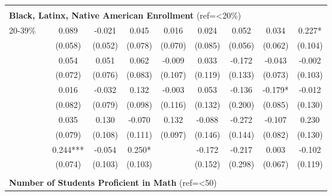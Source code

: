 \begin{tabular*}{\linewidth}{@{\extracolsep{\fill} } llcccccccc}
\hline%
&&&&&&&&&\\%
\multicolumn{10}{l}{\multirow{2}{1.8in}{\textbf{Black, Latinx, Native American Enrollment} (ref=<20\%)}}\\%
&&&&&&&&&\\%
\multirow{2}{*}{\hspace{0.2cm}20{-}39\%}&&0.089&{-}0.021&0.045&0.016&0.024&0.052&0.034&0.227*\\%
&&(0.058)&(0.052)&(0.078)&(0.070)&(0.085)&(0.056)&(0.062)&(0.104)\\%
\arrayrulecolor{white}%
\hline%
\arrayrulecolor{white}%
\hline%
\arrayrulecolor{white}%
\hline%
\arrayrulecolor{white}%
\hline%
\arrayrulecolor{white}%
\hline%
\multirow{2}{*}{\hspace{0.2cm}40{-}59\%}&&0.054&0.051&0.062&{-}0.009&0.033&{-}0.172&{-}0.043&{-}0.002\\%
&&(0.072)&(0.076)&(0.083)&(0.107)&(0.119)&(0.133)&(0.073)&(0.103)\\%
\arrayrulecolor{white}%
\hline%
\arrayrulecolor{white}%
\hline%
\arrayrulecolor{white}%
\hline%
\arrayrulecolor{white}%
\hline%
\arrayrulecolor{white}%
\hline%
\multirow{2}{*}{\hspace{0.2cm}60{-}79\%}&&0.016&{-}0.032&0.132&{-}0.003&0.053&{-}0.136&{-}0.179*&{-}0.012\\%
&&(0.082)&(0.079)&(0.098)&(0.116)&(0.132)&(0.200)&(0.085)&(0.130)\\%
\arrayrulecolor{white}%
\hline%
\arrayrulecolor{white}%
\hline%
\arrayrulecolor{white}%
\hline%
\arrayrulecolor{white}%
\hline%
\arrayrulecolor{white}%
\hline%
\multirow{2}{*}{\hspace{0.2cm}80{-}89\%}&&0.035&0.130&{-}0.070&0.132&{-}0.088&{-}0.272&{-}0.107&0.230\\%
&&(0.079)&(0.108)&(0.111)&(0.097)&(0.146)&(0.144)&(0.082)&(0.130)\\%
\arrayrulecolor{white}%
\hline%
\arrayrulecolor{white}%
\hline%
\arrayrulecolor{white}%
\hline%
\arrayrulecolor{white}%
\hline%
\arrayrulecolor{white}%
\hline%
\multirow{2}{*}{\hspace{0.2cm}90\%+}&&0.244***&{-}0.054&0.250*&&{-}0.172&{-}0.217&0.003&{-}0.102\\%
&&(0.074)&(0.103)&(0.103)&&(0.152)&(0.298)&(0.067)&(0.119)\\%
\arrayrulecolor{white}%
\hline%
\arrayrulecolor{white}%
\hline%
\arrayrulecolor{white}%
\hline%
\arrayrulecolor{white}%
\hline%
\arrayrulecolor{white}%
\hline%
&&&&&&&&&\\%
\multicolumn{10}{l}{\multirow{2}{1.8in}{\textbf{Number of Students Proficient in Math} (ref=<50)}}\\%

\end{tabular*}
